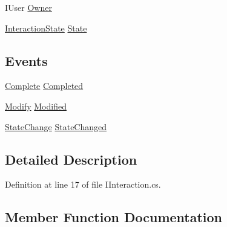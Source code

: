 \begin{DoxyCompactItemize}
\item 
I\+User \hyperlink{interface_plex_byte_1_1_mo_cap_1_1_interactions_1_1_i_interaction_aa6fdd0b6da97043e6961ca3ec04e1d94}{Owner}
\item 
\hyperlink{namespace_plex_byte_1_1_mo_cap_1_1_interactions_afcb673d9186608b6bd3b187179aedc8a}{Interaction\+State} \hyperlink{interface_plex_byte_1_1_mo_cap_1_1_interactions_1_1_i_interaction_a149f0058af52987cef67f429ba756d01}{State}
\end{DoxyCompactItemize}
\subsection*{Events}
\begin{DoxyCompactItemize}
\item 
\hyperlink{namespace_plex_byte_1_1_mo_cap_1_1_interactions_ac81ac3321ab2b018c75ad2c18ec15b9e}{Complete} \hyperlink{interface_plex_byte_1_1_mo_cap_1_1_interactions_1_1_i_interaction_a7ebca376ae67dbaab7d8a2659f15aa20}{Completed}
\item 
\hyperlink{namespace_plex_byte_1_1_mo_cap_1_1_interactions_a490186f613e46adce26244f3b2c78a58}{Modify} \hyperlink{interface_plex_byte_1_1_mo_cap_1_1_interactions_1_1_i_interaction_a54b3a6e068719473b4a34d10504766a1}{Modified}
\item 
\hyperlink{namespace_plex_byte_1_1_mo_cap_1_1_interactions_af2ff213e81451f96fc74bfad114cecde}{State\+Change} \hyperlink{interface_plex_byte_1_1_mo_cap_1_1_interactions_1_1_i_interaction_af6cf60a1a30e422da1b7552868c03001}{State\+Changed}
\end{DoxyCompactItemize}


\subsection{Detailed Description}


Definition at line 17 of file I\+Interaction.\+cs.



\subsection{Member Function Documentation}
